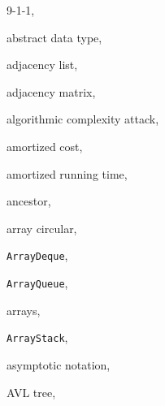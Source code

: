 \documentclass[10pt]{book}
\theoremstyle{plain}
\theoremstyle{definition}
\begin{document}
\cleardoublepage
{}
\begin{theindex}

  \item 9-1-1, 

  \indexspace

  \item abstract data type, 
  \item adjacency list, 
  \item adjacency matrix, 
  \item algorithmic complexity attack, 
  \item amortized cost, 
  \item amortized running time, 
  \item ancestor, 
  \item array
    \subitem circular, 
  \item \texttt{ArrayDeque}, 
  \item \texttt{ArrayQueue}, 
  \item arrays, 
  \item \texttt{ArrayStack}, 
  \item asymptotic notation, 
  \item AVL tree, 

  \indexspace


\end{theindex}
\end{document}

